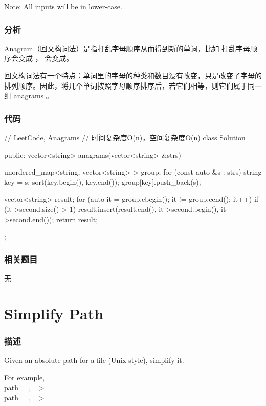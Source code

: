 Note: All inputs will be in lower-case.


\subsubsection{分析}
Anagram（回文构词法）是指打乱字母顺序从而得到新的单词，比如  打乱字母顺序会变成  ， 会变成。

回文构词法有一个特点：单词里的字母的种类和数目没有改变，只是改变了字母的排列顺序。因此，将几个单词按照字母顺序排序后，若它们相等，则它们属于同一组 anagrams 。


\subsubsection{代码}
\begin{Code}
// LeetCode, Anagrams
// 时间复杂度O(n)，空间复杂度O(n)
class Solution {
public:
    vector<string> anagrams(vector<string> &strs) {
        unordered_map<string, vector<string> > group;
        for (const auto &s : strs) {
            string key = s;
            sort(key.begin(), key.end());
            group[key].push_back(s);
        }

        vector<string> result;
        for (auto it = group.cbegin(); it != group.cend(); it++) {
            if (it->second.size() > 1)
                result.insert(result.end(), it->second.begin(), it->second.end());
        }
        return result;
    }
};
\end{Code}


\subsubsection{相关题目}
\begindot
\item 无
\myenddot


\section{Simplify Path} %
\label{sec:simplify-path}


\subsubsection{描述}
Given an absolute path for a file (Unix-style), simplify it.

For example, \\
path = , =>  \\
path = , =>  \\


